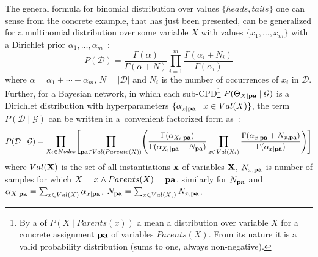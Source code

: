 \documentclass[english,cover]{fitthesis} %
\newcommand{\vars}[1]{{\bold{#1}}}         %
\begin{document}
The general formula for binomial distribution over values $\lbrace heads, tails \rbrace$ one can sense from the concrete example, that has just been presented, can be generalized for a multinomial distribution over some variable $X$ with values $\lbrace x_1, \dots, x_m \rbrace$ with a Dirichlet prior $\alpha_1, \dots, \alpha_m$~\cite[p.~798]{pgm}:
\begin{equation}\label{eq:bayesian_score_multinomial}
    P(\mathcal{D})
      = \frac{\Gamma(\alpha)}{\Gamma(\alpha + N)}
        \prod_{i=1}^m
        \frac{\Gamma(\alpha_i + N_i)}{\Gamma(\alpha_i)}
\end{equation}
where $\alpha = \alpha_1 + \dotsm + \alpha_m$, $N = | \mathcal{D}|$ and $N_i$ is the number of occurrences of $x_i$ in $\mathcal{D}$. Further, for a Bayesian network, in which each sub-CPD\footnote{By a  of $P(X \mid Parents(x))$ a mean a distribution over variable $X$ for a concrete assignment $\vars{pa}$ of variables $Parents(X)$. From its nature it is a valid probability distribution (sums to one, always non-negative).} $P(\Theta_{X \mid \vars{pa}} \mid \mathcal{G})$ is a Dirichlet distribution with hyperparameters $\lbrace \alpha_{x \mid \vars{pa}} \mid x \in Val(X)\rbrace$, the term $P(\mathcal{D} \mid \mathcal{G})$ can be written in a~convenient factorized form as~\cite[p.~801]{pgm}:
\begin{equation}\label{eq:bayesian_score_for_bn}
    P(\mathcal{D} \mid \mathcal{G})
      = \prod_{X_i \in Nodes}
             \Biggl[
                \prod_{\vars{pa} \in Val(Parents(X))}
                   \Biggl(
                      \frac{\Gamma(\alpha_{X_i \mid \vars{pa}})}{\Gamma(\alpha_{X_i \mid \vars{pa}} + N_{\vars{pa}})}
                      \prod_{x \in Val(X_i)} \frac{\Gamma(\alpha_{x \mid \vars{pa}} + N_{x, \vars{pa}})}{\Gamma(\alpha_{x \mid \vars{pa}})}
                   \Biggr)
             \Biggr]
\end{equation}
where $Val(\vars{X})$ is the set of all instantiations $\vars{x}$ of variables $\vars{X}$, $N_{x,\vars{pa}}$ is number of samples for which $X = x \land Parents(X) = \vars{pa}$, similarly for $N_\vars{pa}$ and $\alpha_{X \mid \vars{pa}} = \sum_{x \in Val(X)} \alpha_{x \mid \vars{pa}}$, $N_\vars{pa} = \sum_{x \in Val(X_i)} N_{x,\vars{pa}}$.
\end{document}
